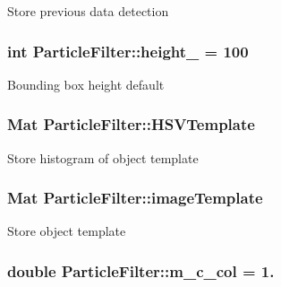 Store previous data detection \hypertarget{classParticleFilter_abdccfa3c90b27db7fa20ccc059687073}{
\subsubsection[{height\-\_\-}]{\setlength{\rightskip}{0pt plus 5cm}int Particle\-Filter\-::height\-\_\- = 100\hspace{0.3cm}{\ttfamily [protected]}}}\label{classParticleFilter_abdccfa3c90b27db7fa20ccc059687073}
Bounding box height default \hypertarget{classParticleFilter_a4bf1b980e79eb4677a6274cbc70be0fa}{
\subsubsection[{H\-S\-V\-Template}]{\setlength{\rightskip}{0pt plus 5cm}Mat Particle\-Filter\-::\-H\-S\-V\-Template\hspace{0.3cm}{\ttfamily [protected]}}}\label{classParticleFilter_a4bf1b980e79eb4677a6274cbc70be0fa}
Store histogram of object template \hypertarget{classParticleFilter_a5cd6a05af7e09715cc7728abac18d38e}{
\subsubsection[{image\-Template}]{\setlength{\rightskip}{0pt plus 5cm}Mat Particle\-Filter\-::image\-Template\hspace{0.3cm}{\ttfamily [protected]}}}\label{classParticleFilter_a5cd6a05af7e09715cc7728abac18d38e}
Store object template \hypertarget{classParticleFilter_a1895837e832bd2f05bd5e4a23b4b50c0}{
\subsubsection[{m\-\_\-c\-\_\-col}]{\setlength{\rightskip}{0pt plus 5cm}double Particle\-Filter\-::m\-\_\-c\-\_\-col = 1.\hspace{0.3cm}{\ttfamily [protected]}}}\label{classParticleFilter_a1895837e832bd2f05bd5e4a23b4b50c0}
